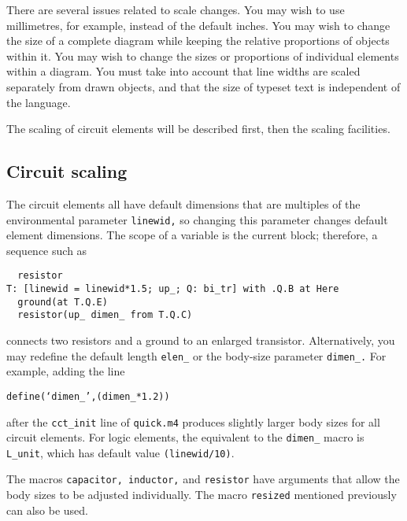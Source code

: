There are several issues related to scale changes.  You may wish to use
millimetres, for example, instead of the default inches.  You may wish
to change the size of a complete diagram while keeping the relative
proportions of objects within it.  You may wish to change the sizes or
proportions of individual elements within a diagram.  You must take
into account that line widths are scaled separately from drawn objects,
and that the size of typeset text is independent of the \pic language.

The scaling of circuit elements will be described first, then
the \pic scaling facilities.

\subsection{Circuit scaling\label{Circuitscaling:}}
The circuit elements all have default dimensions
that are multiples of the \pic environmental parameter {\tt linewid,}
so changing this parameter changes default element dimensions.
The scope of a \pic variable is the current block; therefore, a sequence
such as

\begin{verbatim}
  resistor
T: [linewid = linewid*1.5; up_; Q: bi_tr] with .Q.B at Here
  ground(at T.Q.E)
  resistor(up_ dimen_ from T.Q.C)
\end{verbatim}

\noindent%
connects two resistors and a ground to an enlarged transistor.
Alternatively, you may redefine the default length {\tt elen\_}
or the body-size parameter {\tt dimen\_.}  For example, adding the line

{\tt define(`dimen\_',(dimen\_*1.2))}

\noindent%
after the {\tt cct\_init} line of {\tt quick.m4} produces slightly
larger body sizes for all circuit elements.  For logic elements, the
equivalent to the {\tt dimen\_} macro is {\tt L\_unit}, which has
default value {\tt (linewid/10)}.

The macros {\tt capacitor, inductor,} and {\tt resistor} have arguments
that allow the body sizes to be adjusted individually.  The macro
{\tt resized} mentioned previously can also be used.

